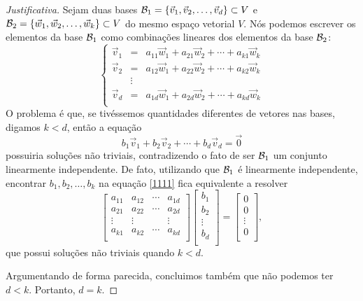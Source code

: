 \documentclass[../livro.tex]{subfiles}  %
\begin{document}
\begin{proof}[Justificativa] Sejam duas bases $\mathcal{B}_1 = \{\vec{v}_1, \vec{v}_2, \dots, \vec{v}_d\} \subset V$ e $\mathcal{B}_2 = \{\vec{w}_1, \vec{w}_2, \dots, \vec{w}_k\} \subset V$ do mesmo espaço vetorial $V$. Nós podemos escrever os elementos da base $\mathcal{B}_1$ como combinações lineares dos elementos da base $\mathcal{B}_2$:
	\[
	\left\{
	\begin{array}{rcl}
	\vec{v}_1 &=& a_{11} \vec{w}_1 + a_{21} \vec{w}_2 + \cdots + a_{k1} \vec{w}_k \\
	\vec{v}_2 &=& a_{12} \vec{w}_1 + a_{22} \vec{w}_2 + \cdots + a_{k2} \vec{w}_k \\ 
	&     \vdots& \\
	\vec{v}_d &=& a_{1d} \vec{w}_1 + a_{2d} \vec{w}_2 + \cdots + a_{kd} \vec{w}_k \\
	\end{array}
	\right.
	\] O problema é que, se tivéssemos quantidades diferentes de vetores nas bases, digamos $k<d$, então a equação 
	\begin{equation}\label{1111}
	b_1 \vec{v}_1 + b_2 \vec{v}_2 + \cdots + b_d \vec{v}_d = \vec{0}
	\end{equation} possuiria soluções não triviais, contradizendo o fato de ser $\mathcal{B}_1$ um conjunto linearmente independente. De fato, utilizando que $\mathcal{B}_1$ é linearmente independente, encontrar $b_1, b_2, \dots, b_k$ na equação \eqref{1111} fica equivalente a resolver
	\[
	\left[
	\begin{array}{cccc}
	a_{11} & a_{12} & \cdots & a_{1d} \\
	a_{21} & a_{22} & \cdots & a_{2d} \\
	\vdots & \vdots &        & \vdots \\
	a_{k1} & a_{k2} & \cdots & a_{kd} \\
	\end{array}
	\right] 
	\left[
	\begin{array}{c}
	b_1 \\
	b_2 \\
	\vdots  \\
	b_d \\
	\end{array}
	\right] = 
	\left[
	\begin{array}{c}
	0 \\
	0 \\
	\vdots  \\
	0 \\
	\end{array}
	\right],
	\] que possui soluções não triviais quando $k<d$.
	
	Argumentando de forma parecida, concluimos também que não podemos ter $d<k$. Portanto, $d=k$.
\end{proof}
\end{document}
